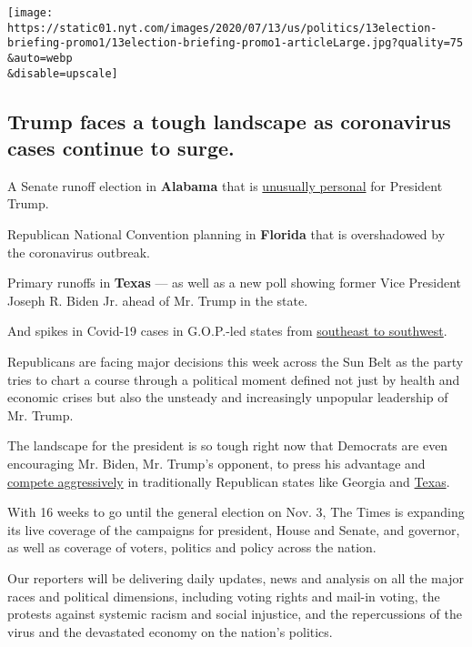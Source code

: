 \texttt{[image: https://static01.nyt.com/images/2020/07/13/us/politics/13election-briefing-promo1/13election-briefing-promo1-articleLarge.jpg?quality=75\\\&auto=webp\\\&disable=upscale]}

\hypertarget{trump-faces-a-tough-landscape-as-coronavirus-cases-continue-to-surge}{%
\subsection{Trump faces a tough landscape as coronavirus cases continue
to
surge.}\label{trump-faces-a-tough-landscape-as-coronavirus-cases-continue-to-surge}}

A Senate runoff election in \textbf{Alabama} that is
\href{https://www.nytimes.com/2020/07/12/us/politics/alabama-senate-jeff-sessions-tommy-tuberville.html}{unusually
personal} for President Trump.

Republican National Convention planning in \textbf{Florida} that is
overshadowed by the coronavirus outbreak.

Primary runoffs in \textbf{Texas} --- as well as a new poll showing
former Vice President Joseph R. Biden Jr. ahead of Mr. Trump in the
state.

And spikes in Covid-19 cases in G.O.P.-led states from
\href{https://www.nytimes.com/interactive/2020/us/coronavirus-us-cases.html}{southeast
to southwest}.

Republicans are facing major decisions this week across the Sun Belt as
the party tries to chart a course through a political moment defined not
just by health and economic crises but also the unsteady and
increasingly unpopular leadership of Mr. Trump.

The landscape for the president is so tough right now that Democrats are
even encouraging Mr. Biden, Mr. Trump's opponent, to press his advantage
and
\href{https://www.nytimes.com/2020/07/11/us/politics/trump-biden-2020-election.html}{compete
aggressively} in traditionally Republican states like Georgia and
\href{https://www.dallasnews.com/news/public-health/2020/07/12/joe-biden-builds-lead-over-donald-trump-in-reliably-red-texas-as-voters-sour-on-handling-of-virus/}{Texas}.

With 16 weeks to go until the general election on Nov. 3, The Times is
expanding its live coverage of the campaigns for president, House and
Senate, and governor, as well as coverage of voters, politics and policy
across the nation.

Our reporters will be delivering daily updates, news and analysis on all
the major races and political dimensions, including voting rights and
mail-in voting, the protests against systemic racism and social
injustice, and the repercussions of the virus and the devastated economy
on the nation's politics.

